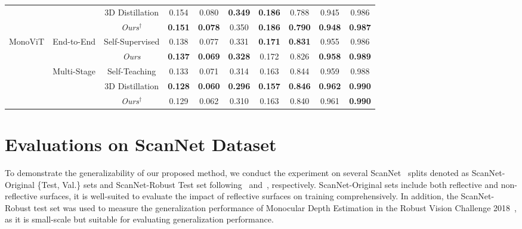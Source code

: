 \begin{table}[ht]
{\begin{tabular}{@{}l|c|c|ccccccc@{}}
    & & 3D Distillation & 0.154 & 0.080 & \textbf{0.349} & \textbf{0.186} & 0.788 & 0.945 & 0.986 \\
    & & \textit{Ours}$^{\dagger}$ & \textbf{0.151} & \textbf{0.078} & 0.350 & \textbf{0.186} & \textbf{0.790} & \textbf{0.948} & \textbf{0.987} \\
    \midrule
    \multirow{5}{*}{MonoViT} & \multirow{2}{*}{End-to-End} & Self-Supervised & 0.138 & 0.077 & 0.331 & \textbf{0.171} & \textbf{0.831} & 0.955 & 0.986 \\
    & & \textit{Ours} & \textbf{0.137} & \textbf{0.069} & \textbf{0.328} & 0.172 & 0.826 & \textbf{0.958} & \textbf{0.989} \\
    \cmidrule{2-10}
    & \multirow{3}{*}{Multi-Stage} & Self-Teaching & 0.133 & 0.071 & 0.314 & 0.163 & 0.844 & 0.959 & 0.988 \\
    & & 3D Distillation & \textbf{0.128} & \textbf{0.060} & \textbf{0.296} & \textbf{0.157} & \textbf{0.846} & \textbf{0.962} & \textbf{0.990} \\
    & & \textit{Ours}$^{\dagger}$ & 0.129 & 0.062 & 0.310 & 0.163 & 0.840 & 0.961 & \textbf{0.990} \\
  \bottomrule
  \end{tabular}}
\end{table}

\section{Evaluations on ScanNet Dataset}
To demonstrate the generalizability of our proposed method, we conduct the experiment on several ScanNet~\citep{dai2017scannet} splits denoted as ScanNet-Original \{Test, Val.\} sets and ScanNet-Robust Test set following~\citet{shi20233d} and~\citet{fu2018deep, bae2022multi}, respectively.
ScanNet-Original sets include both reflective and non-reflective surfaces, it is well-suited to evaluate the impact of reflective surfaces on training comprehensively.
In addition, the ScanNet-Robust test set was used to measure the generalization performance of Monocular Depth Estimation in the Robust Vision Challenge 2018~\citep{geiger2018robust}, as it is small-scale but suitable for evaluating generalization performance.

